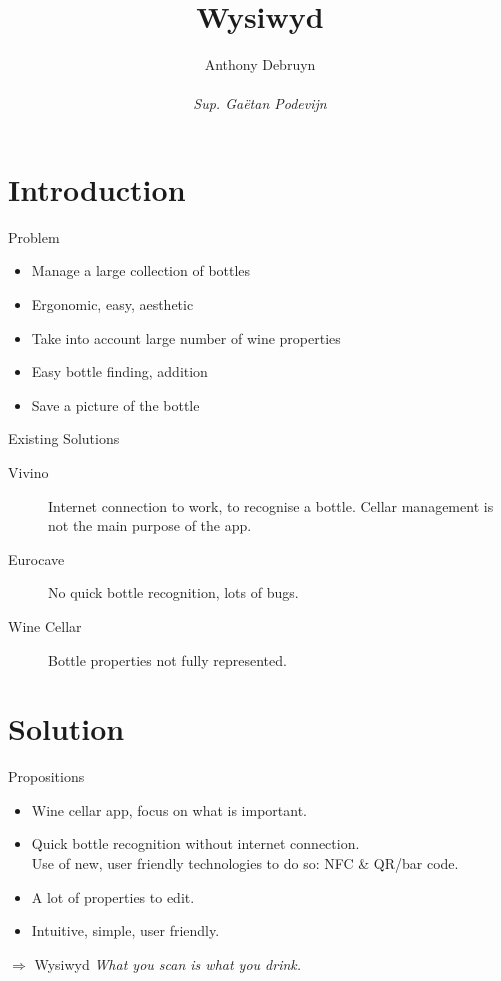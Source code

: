 \documentclass[11pt]{beamer}
\author[A.D.]{Anthony Debruyn\\~\\\small{\textit{Sup. Gaëtan Podevijn}}}
\title{Wysiwyd}
\institute[ULB]{Université Libre de Bruxelles}
\begin{document}
\begin{frame}
\titlepage
\end{frame}

\begin{frame}
\tableofcontents
\end{frame}

\section{Introduction}
\begin{frame}{Problem}

\begin{itemize}
	\item Manage a large collection of bottles
	\item Ergonomic, easy, aesthetic
	\item Take into account large number of wine properties
	\item Easy bottle finding, addition
	\item Save a picture of the bottle
\end{itemize}

\end{frame}

\begin{frame}{Existing Solutions}
\begin{description}
	\item[Vivino] Internet connection to work, to recognise a bottle. Cellar management is not the main purpose of the app.
	\item[Eurocave] No quick bottle recognition, lots of bugs.
	\item[Wine Cellar] Bottle properties not fully represented.
\end{description}
\end{frame}

\section{Solution}

\begin{frame}{Propositions}
\begin{itemize}
	\item Wine cellar app, focus on what is important.
	\item Quick bottle recognition without internet connection.\\
	Use of new, user friendly technologies to do so: NFC \& QR/bar code.
	\item A lot of properties to edit.
	\item Intuitive, simple, user friendly.
\end{itemize}

\center $\Rightarrow$ Wysiwyd
\center \emph{What you scan is what you drink.}
\end{frame}
\end{document}
